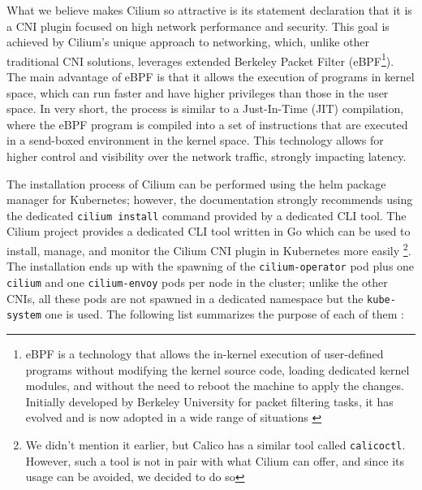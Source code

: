 What we believe makes Cilium so attractive is its statement declaration that it
is a CNI plugin focused on high network performance and security. This goal is
achieved by Cilium's unique approach to networking, which, unlike other
traditional CNI solutions, leverages extended Berkeley Packet Filter
(eBPF\footnote{eBPF is a technology that allows the in-kernel execution of
user-defined programs without modifying the kernel source code, loading
dedicated kernel modules, and without the need to reboot the machine to apply
the changes. Initially developed by Berkeley University for packet filtering
tasks, it has evolved and is now adopted in a wide range of situations
\cite{Hedam2021}}). The main advantage of eBPF is that it allows the execution
of programs in kernel space, which can run faster and have higher privileges
than those in the user space. In very short, the process is similar to a
Just-In-Time (JIT) compilation, where the eBPF program is compiled into a set of
instructions that are executed in a send-boxed environment in the kernel
space\cite{Sharaf2022}. This technology allows for higher control and visibility
over the network traffic, strongly impacting latency.


The installation process of Cilium can be performed using the helm package
manager for Kubernetes; however, the documentation strongly recommends using the
dedicated \texttt{cilium install} command provided by a dedicated CLI tool. The
Cilium project provides a dedicated CLI tool written in Go which can be used to
install, manage, and monitor the Cilium CNI plugin in Kubernetes more easily
\footnote{We didn't mention it earlier, but Calico has a similar tool called
\texttt{calicoctl}. However, such a tool is not in pair with what Cilium can
offer, and since its usage can be avoided, we decided to do so}. The
installation ends up with the spawning of the \texttt{cilium-operator} pod plus
one \texttt{cilium} and one \texttt{cilium-envoy} pods per node in the cluster;
unlike the other CNIs, all these pods are not spawned in a dedicated namespace
but the \texttt{kube-system} one is used. The following list summarizes the
purpose of each of them \cite{ciliumdoc-components, ciliumdoc-envoy}:

